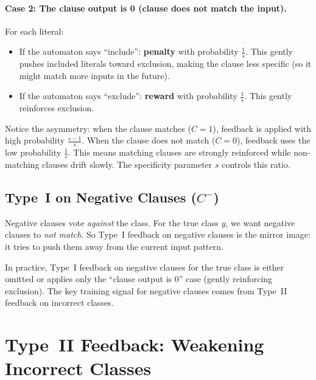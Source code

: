 \paragraph{Case 2: The clause output is 0 (clause does not match the input).}

For each literal:
\begin{itemize}
  \item If the automaton says ``include'': \textbf{penalty} with
    probability $\frac{1}{s}$. This gently pushes included literals
    toward exclusion, making the clause less specific (so it might
    match more inputs in the future).
  \item If the automaton says ``exclude'': \textbf{reward} with
    probability $\frac{1}{s}$. This gently reinforces exclusion.
\end{itemize}

\begin{engineernote}
Notice the asymmetry: when the clause matches ($C = 1$), feedback is
applied with high probability $\frac{s-1}{s}$. When the clause does
not match ($C = 0$), feedback uses the low probability $\frac{1}{s}$.
This means matching clauses are strongly reinforced while non-matching
clauses drift slowly. The specificity parameter $s$ controls this
ratio.
\end{engineernote}

\subsection{Type~I on Negative Clauses ($C^-$)}

Negative clauses vote \emph{against} the class. For the true class
$y$, we want negative clauses to \emph{not match}. So Type~I feedback
on negative clauses is the mirror image: it tries to push them away
from the current input pattern.

In practice, Type~I feedback on negative clauses for the true class
is either omitted or applies only the ``clause output is 0'' case
(gently reinforcing exclusion). The key training signal for negative
clauses comes from Type~II feedback on incorrect classes.


\section{Type~II Feedback: Weakening Incorrect Classes}
\label{sec:type2}

